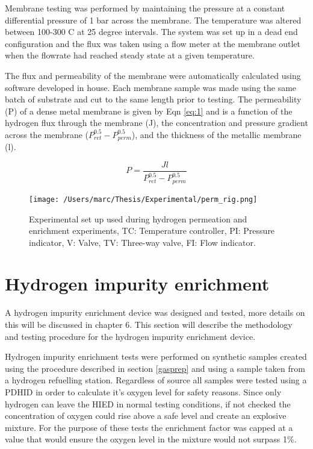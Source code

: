 Membrane testing was performed by maintaining the pressure at a constant differential pressure of 1 bar across the membrane. The temperature was altered between 100-300 \textdegree C at 25 degree intervals. The system was set up in a dead end configuration and the flux was taken using a flow meter at the membrane outlet when the flowrate had reached steady state at a given temperature. 

The flux and permeability of the membrane were automatically calculated using software developed in house. Each membrane sample was made using the same batch of substrate and cut to the same length prior to testing. The permeability (P)  of a dense metal membrane is given by Eqn \ref{eq:1} \cite{NathanW.Ockwig2007} and is a function of the hydrogen flux through the membrane (J), the concentration and pressure gradient across the membrane ($P^{0.5}_{ret}-P^{0.5}_{perm}$), and the thickness of the metallic membrane (l). 

\begin{equation} \label{eq:1}
    P = \frac{J l}{P^{0.5}_{ret}-P^{0.5}_{perm}}
\end{equation}

\begin{landscape}
\begin{figure}[h]
  \centering
  \texttt{[image: /Users/marc/Thesis/Experimental/perm\_rig.png]}
  \caption{Experimental set up used during hydrogen permeation and enrichment experiments, TC: Temperature controller, PI: Pressure indicator, V: Valve, TV: Three-way valve,  FI: Flow indicator.}
  \label{testrig}
\end{figure}

\end{landscape}

\section{Hydrogen impurity enrichment}\label{enrichproc}
A hydrogen impurity enrichment device was designed and tested, more details on this will be discussed in chapter 6. This section will describe the methodology and testing procedure for the hydrogen impurity enrichment device. 

Hydrogen impurity enrichment tests were performed on synthetic samples created using the procedure described in section \ref{gasprep} and using a sample taken from a hydrogen refuelling station. Regardless of source all samples were tested using a PDHID in order to calculate it's oxygen level for safety reasons. Since only hydrogen can leave the HIED in normal testing conditions, if not checked the concentration of oxygen could rise above a safe level and create an explosive mixture. For the purpose of these tests the enrichment factor was capped at a value that would ensure the oxygen level in the mixture would not surpass 1\%. 

